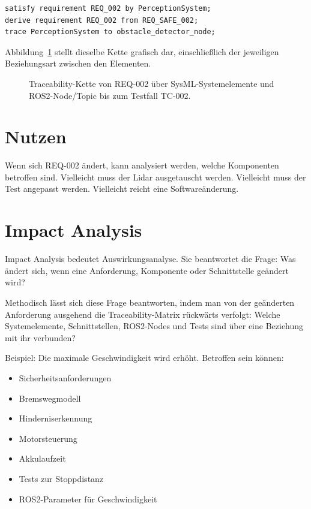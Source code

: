 \begin{lstlisting}
satisfy requirement REQ_002 by PerceptionSystem;
derive requirement REQ_002 from REQ_SAFE_002;
trace PerceptionSystem to obstacle_detector_node;
\end{lstlisting}

Abbildung~\ref{fig:kap20-traceability-kette-req002} stellt dieselbe Kette grafisch dar, einschließlich der jeweiligen Beziehungsart zwischen den Elementen.

\begin{figure}[H]
  \centering
  \caption{Traceability-Kette von REQ-002 über SysML-Systemelemente und ROS2-Node/Topic bis zum Testfall TC-002.}
  \label{fig:kap20-traceability-kette-req002}
\end{figure}

\section{Nutzen}
Wenn sich REQ-002 ändert, kann analysiert werden, welche Komponenten betroffen sind. Vielleicht muss der Lidar ausgetauscht werden. Vielleicht muss der Test angepasst werden. Vielleicht reicht eine Softwareänderung.

\section{Impact Analysis}
Impact Analysis bedeutet Auswirkungsanalyse. Sie beantwortet die Frage: Was ändert sich, wenn eine Anforderung, Komponente oder Schnittstelle geändert wird?

Methodisch lässt sich diese Frage beantworten, indem man von der geänderten Anforderung ausgehend die Traceability-Matrix rückwärts verfolgt: Welche Systemelemente, Schnittstellen, ROS2-Nodes und Tests sind über eine Beziehung mit ihr verbunden?

Beispiel: Die maximale Geschwindigkeit wird erhöht. Betroffen sein können:

\begin{itemize}
    \item Sicherheitsanforderungen
    \item Bremswegmodell
    \item Hinderniserkennung
    \item Motorsteuerung
    \item Akkulaufzeit
    \item Tests zur Stoppdistanz
    \item ROS2-Parameter für Geschwindigkeit
\end{itemize}

